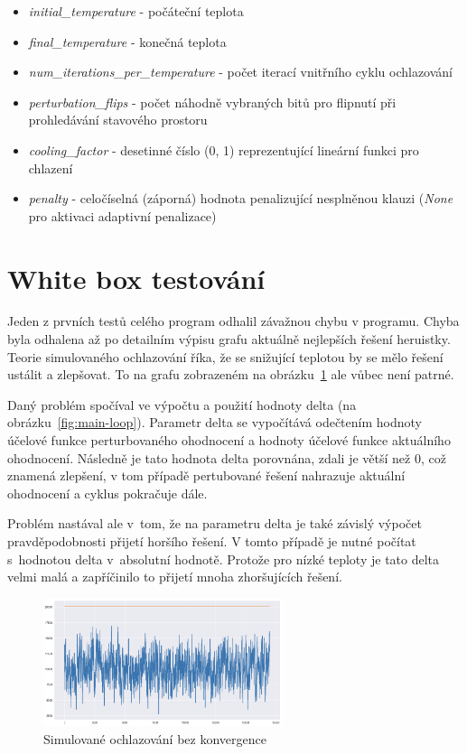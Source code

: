 \documentclass[twoside,twocolumn]{article}
\begin{document}
    \begin{itemize}
        \item \emph{initial\_temperature} - počáteční teplota
        \item \emph{final\_temperature} - konečná teplota
        \item \emph{num\_iterations\_per\_temperature} - počet iterací vnitřního cyklu ochlazování
        \item \emph{perturbation\_flips} - počet náhodně vybraných bitů pro flipnutí při prohledávání stavového prostoru
        \item \emph{cooling\_factor} - desetinné číslo (0, 1) reprezentující lineární funkci pro chlazení
        \item \emph{penalty} - celočíselná (záporná) hodnota penalizující nesplněnou klauzi (\emph{None} pro aktivaci adaptivní penalizace)
    \end{itemize}


    \section{White box testování}

    Jeden z prvních testů celého program odhalil závažnou chybu v programu.
    Chyba byla odhalena až po detailním výpisu grafu aktuálně nejlepších řešení heruistky.
    Teorie simulovaného ochlazování říka, že se snižující teplotou by se mělo řešení ustálit a zlepšovat.
    To na grafu zobrazeném na obrázku~\ref{fig:no-convergence} ale vůbec není patrné.

    Daný problém spočíval ve výpočtu a použití hodnoty delta (na obrázku~\ref{fig:main-loop}).
    Parametr delta se vypočítává odečtením hodnoty účelové funkce perturbovaného ohodnocení a hodnoty účelové funkce
    aktuálního ohodnocení.
    Následně je tato hodnota delta porovnána, zdali je větší než 0, což znamená zlepšení, v tom případě pertubované řešení
    nahrazuje aktuální ohodnocení a cyklus pokračuje dále.

    Problém nastával ale v~tom, že na parametru delta je také závislý výpočet pravděpodobnosti přijetí horšího řešení.
    V tomto případě je nutné počítat s~hodnotou delta v~absolutní hodnotě.
    Protože pro nízké teploty je tato delta velmi malá a zapříčinilo to přijetí mnoha zhoršujících řešení.

    \begin{figure}
        \centering
        \includegraphics[width=7cm]{images/no-convergence}
        \caption{Simulované ochlazování bez konvergence}
        \label{fig:no-convergence}
    \end{figure}
\end{document}
